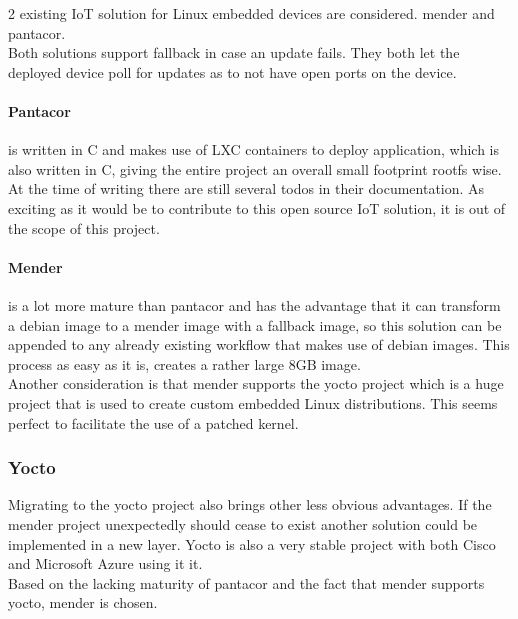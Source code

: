 \documentclass[../../main.tex]{subfiles}
\begin{document}
2 existing IoT solution for Linux embedded devices are considered.
mender\cite{mender-home} and pantacor\cite{panathub}.\\

Both solutions support fallback in case an update fails.
They both let the deployed device poll for updates as to not have open ports on the device.

\paragraph{Pantacor}%
\label{par:pantacor}

is written in C and makes use of LXC containers to deploy application, which is also written in C,
giving the entire project an overall small footprint rootfs wise.\\
At the time of writing there are still several todos in their documentation. As exciting as it
would be to contribute to this open source IoT solution, it is out of the scope of this project.


\paragraph{Mender}%
\label{par:mender}

is a lot more mature than pantacor and has the advantage that it can transform a debian image
to a mender image with a fallback image, so this solution can be appended to any already 
existing workflow that makes use of debian images. This process as easy as it is, creates a
rather large 8GB image.\\

Another consideration is that mender supports the yocto project which is a huge project that is
used to create custom embedded Linux distributions. This seems perfect to facilitate the use of
a patched kernel.\\

\subsubsection{Yocto}%
\label{ssub:yocto}

Migrating to the yocto project also brings other less obvious advantages.
If the mender project unexpectedly should cease to exist another solution could
be implemented in a new layer.
Yocto is also a very stable project with both Cisco and Microsoft Azure using it it.
\\


Based on the lacking maturity of pantacor and the fact that mender supports yocto, mender is
chosen.
\end{document}
